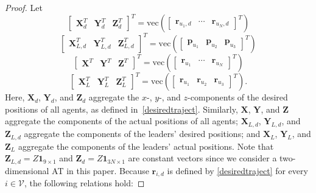 \documentclass[journal]{IEEEtran}
\theoremstyle{definition}
\theoremstyle{plain}
\begin{document}
\begin{proof}
Let
\begin{equation}
    \begin{bmatrix}
        \mathbf{X}_d^T&
        \mathbf{Y}_d^T&
        \mathbf{Z}_d^T
    \end{bmatrix}^T
    =\mathrm{vec}\left(\begin{bmatrix}
        \mathbf{r}_{u_1,d}&\cdots&\mathbf{r}_{u_N,d}
    \end{bmatrix}^T\right)
\end{equation}
\begin{equation}
    \begin{bmatrix}
        \mathbf{X}_{L,d}^T&
        \mathbf{Y}_{L,d}^T&
        \mathbf{Z}_{L,d}^T
    \end{bmatrix}^T
    =\mathrm{vec}\left(\begin{bmatrix}
        \mathbf{p}_{u_1}&\mathbf{p}_{u_2}&\mathbf{p}_{u_3}
    \end{bmatrix}^T\right)
\end{equation}
\begin{equation}
    \begin{bmatrix}
        \mathbf{X}^T&
        \mathbf{Y}^T&
        \mathbf{Z}^T
    \end{bmatrix}^T
    =\mathrm{vec}\left(\begin{bmatrix}
        \mathbf{r}_{u_1}&\cdots&\mathbf{r}_{u_N}
    \end{bmatrix}^T\right)
\end{equation}
\begin{equation}
    \begin{bmatrix}
        \mathbf{X}_{L}^T&
        \mathbf{Y}_{L}^T&
        \mathbf{Z}_{L}^T
    \end{bmatrix}^T
    =\mathrm{vec}\left(\begin{bmatrix}
        \mathbf{r}_{u_1}&\mathbf{r}_{u_2}&\mathbf{r}_{u_3}
    \end{bmatrix}^T\right).
\end{equation}
Here, $\mathbf{X}_d$, $\mathbf{Y}_d$, and $\mathbf{Z}_d$ aggregate the $x$-, $y$-, and $z$-components of the desired positions of all agents, as defined in~\eqref{desiredtraject}. Similarly, $\mathbf{X}$, $\mathbf{Y}$, and $\mathbf{Z}$ aggregate the components of the actual positions of all agents; $\mathbf{X}_{L,d}$, $\mathbf{Y}_{L,d}$, and $\mathbf{Z}_{L,d}$ aggregate the components of the leaders’ desired positions; and $\mathbf{X}_{L}$, $\mathbf{Y}_{L}$, and $\mathbf{Z}_{L}$ aggregate the components of the leaders’ actual positions. Note that $\mathbf{Z}_{L,d}=Z\mathbf{1}_{9\times 1}$ and  $\mathbf{Z}_{d}=Z\mathbf{1}_{3N\times 1}$ are constant vectors since we consider a two-dimensional AT in this paper. Because $\mathbf{r}_{i,d}$ is defined by \eqref{desiredtraject} for every $i\in \mathcal{V}$, the following relations hold:

\end{proof}
\end{document}
